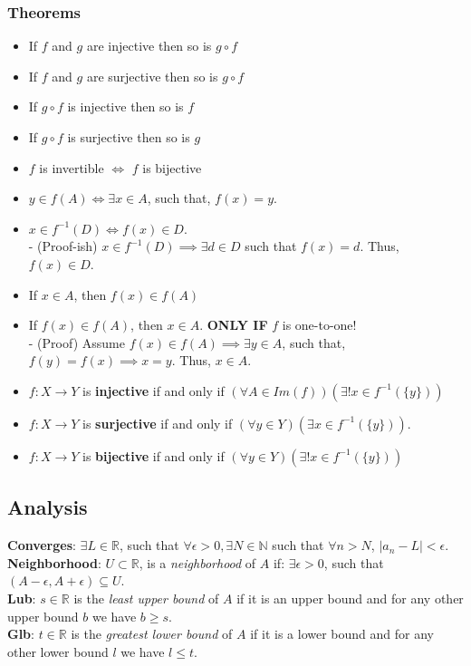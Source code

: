 \documentclass{article}
\newcommand{\abs}[1] {
  \left| #1 \right|
}
\begin{document}
\begin{multicols}{3}
  \subsubsection*{Theorems}
  \begin{itemize}
  \item If $f$ and $g$ are injective then so is $g \circ f$
  \item If $f$ and $g$ are surjective then so is $g \circ f$
  \item If $g \circ f$ is injective then so is $f$
  \item If $g \circ f$ is surjective then so is $g$
  \item $f$ is invertible $\iff$ $f$ is bijective
  \item $y \in f(A) \iff \exists x \in A$, such that, $f(x) = y$.
  \item $x \in f^{-1}(D) \iff f(x) \in D$.\\
    - (Proof-ish) $x \in f^{-1}(D) \implies \exists d \in D$ such that $f(x) = d$. Thus, $f(x) \in D$.
  \item If $x \in A$, then $f(x) \in f(A)$
  \item If $f(x) \in f(A)$, then $x \in A$. \textbf{ONLY IF} $f$ is one-to-one!\\
    - (Proof) Assume $f(x) \in f(A) \implies \exists y \in A$, such that, $f(y) = f(x) \implies x = y$. Thus, $x \in A$.
  \item $f: X \to Y$ is \textbf{injective} if and only if 
    $(\forall A \in Im(f))(\exists! x \in f^{-1}(\{y\}))$
  \item $f: X \to Y$ is \textbf{surjective} if and only if
    $(\forall y \in Y)(\exists x \in f^{-1}(\{y\}))$.
  \item $f: X \to Y$ is \textbf{bijective} if and only if
    $(\forall y \in Y)(\exists ! x \in f^{-1}(\{y\}))$
  \end{itemize}

  \subsection*{Analysis}
  \textbf{Converges}: $\exists L \in \mathbb R$, such that $\forall \epsilon > 0, \exists N \in \mathbb N$ such that $\forall n > N$, $\abs{a_n - L} < \epsilon$.\\
  \textbf{Neighborhood}: $U \subset \mathbb R$, is a \textit{neighborhood} of $A$ if: 
  $\exists \epsilon > 0$, such that $(A - \epsilon, A + \epsilon) \subseteq U$.\\
  \textbf{Lub}: $s \in \mathbb R$ is the \textit{least upper bound} of $A$ if it is an upper bound and for any other upper bound $b$ we have $b \geq s$.\\
  \textbf{Glb}: $t \in \mathbb R$ is the \textit{greatest lower bound} of $A$ if it is a lower bound and for any other lower bound $l$ we have $l \leq t$.


\end{multicols}
\end{document}
